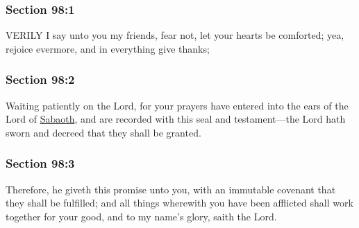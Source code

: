 	\subsubsection{Section 98:1} %
		\label{DC98-1}

		VERILY I say unto you my friends, fear not, let your hearts be comforted; yea, rejoice evermore, and in everything give thanks;


	\subsubsection{Section 98:2} %
		\label{DC98-2}

		Waiting patiently on the Lord, for your prayers have entered into the ears of the Lord of \hyperref[SABAOTH]{Sabaoth}, and are recorded with this seal and testament---the Lord hath sworn and decreed that they shall be granted.


	\subsubsection{Section 98:3} %
		\label{DC98-3}

		Therefore, he giveth this promise unto you, with an immutable covenant that they shall be fulfilled; and all things wherewith you have been afflicted shall work together for your good, and to my name's glory, saith the Lord.



